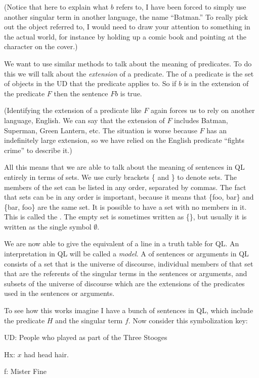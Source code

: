 (Notice that here to explain what $b$ refers to, I have been forced to simply use another singular term in another language, the name ``Batman.'' To really pick out the object referred to, I would need to draw your attention to something in the actual world, for instance by holding up a comic book and pointing at the character on the cover.)

We want to use similar methods to talk about the meaning of predicates. To do this we will talk about the \emph{extension} of a predicate. The  of a predicate is the set of objects in the UD that the predicate applies to. So if $b$ is in the extension of the predicate $F$ then the sentence $Fb$ is true. 

(Identifying the extension of a predicate like $F$ again forces us to rely on another language, English. We can say that the extension of $F$ includes Batman, Superman, Green Lantern, etc. The situation is worse because $F$ has an indefinitely large extension, so we have relied on the English predicate ``fights crime'' to describe it.) 

All this means that we are able to talk about the meaning of sentences in QL entirely in terms of sets. We use curly brackets \{ and \} to denote sets. The members of the set can be listed in any order, separated by commas. The fact that sets can be in any order is important, because it means that \{foo, bar\} and \{bar, foo\} are the same set. It is possible to have a set with no members in it. This is called the . The empty set is sometimes written as \{\}, but usually it is written as the single symbol $\emptyset$.

We are now able to give the equivalent of a line in a truth table for QL. An interpretation in QL will be called a \emph{model}. A  of sentences or arguments in QL consists of a set that is the universe of discourse, individual members of that set that are the referents of the singular terms in the sentences or arguments, and subsets of the universe of discourse which are the extensions of the predicates used in the sentences or arguments. 

To see how this works imagine I have a bunch of sentences in QL, which include the predicate $H$ and the singular term $f$. Now consider this symbolization key:
\begin{ekey}
\item[UD:]People who played as part of the Three Stooges
\item[Hx:]$x$ had head hair.
\item[f:] Mister Fine
\end{ekey}

